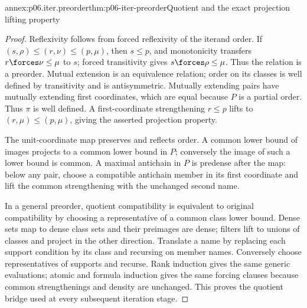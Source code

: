 \begin{annexitem}{annex:p06.iter.preorder}{thm:p06-iter-preorder}{Quotient and the exact projection lifting property}
\begin{proof}
Reflexivity follows from forced reflexivity of the iterand order. If
\((s,\rho)\leq(r,\nu)\leq(p,\mu)\), then \(s\leq p\), and
monotonicity transfers \(r\forces\nu\leq\mu\) to \(s\); forced
transitivity gives \(s\forces\rho\leq\mu\). Thus the relation is
a preorder. Mutual extension is an equivalence relation; order on its
classes is well defined by transitivity and is antisymmetric.
Mutually extending pairs have mutually extending first coordinates,
which are equal because \(P\) is a partial order. Thus \(\pi\) is
well defined. A first-coordinate strengthening \(r\leq p\) lifts
to \((r,\mu)\leq(p,\mu)\), giving the asserted projection property.

The unit-coordinate map preserves and reflects order. A common lower
bound of images projects to a common lower bound in \(P\); conversely
the image of such a lower bound is common. A maximal antichain in
\(P\) is predense after the map: below any pair, choose a compatible
antichain member in its first coordinate and lift the common
strengthening with the unchanged second name.

In a general preorder, quotient compatibility is equivalent to original
compatibility by choosing a representative of a common class lower
bound. Dense sets map to dense class sets and their preimages are dense;
filters lift to unions of classes and project in the other direction.
Translate a name by replacing each support condition by its class and
recursing on member names. Conversely choose representatives of supports
and recurse. Rank induction gives the same generic evaluations; atomic
and formula induction gives the same forcing clauses because common
strengthenings and density are unchanged. This proves the quotient
bridge used at every subsequent iteration stage.
\end{proof}
\end{annexitem}

